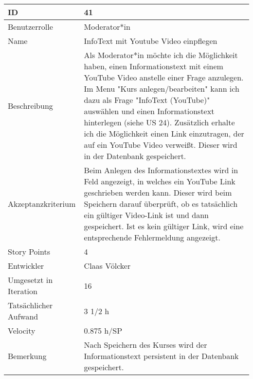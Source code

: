 \begin{tabularx}{\textwidth}{|p{}|X|}
	\hline
	ID & 41\\
	\hline
	Benutzerrolle & Moderator*in\\
	\hline
	Name & InfoText mit Youtube Video einpflegen\\
	\hline
	Beschreibung & Als Moderator*in möchte ich die Möglichkeit haben, einen Informationstext mit einem YouTube Video anstelle einer Frage anzulegen. Im Menu "Kurs anlegen/bearbeiten" kann ich dazu als Frage "InfoText (YouTube)" auswählen und einen Informationstext hinterlegen (siehe US 24). Zusätzlich erhalte ich die Möglichkeit einen Link einzutragen, der auf ein YouTube Video verweißt. Dieser wird in der Datenbank gespeichert.\\
	\hline
	Akzeptanzkriterium & Beim Anlegen des Informationstextes wird in Feld angezeigt, in welches ein YouTube Link geschrieben werden kann. Dieser wird beim Speichern darauf überprüft, ob es tatsächlich ein gültiger Video-Link ist und dann gespeichert. Ist es kein gültiger Link, wird eine entsprechende Fehlermeldung angezeigt. \\
	\hline
	Story Points & 4\\
	\hline
	Entwickler & Claas Völcker\\
	\hline
	Umgesetzt in Iteration & 16\\
	\hline
	Tatsächlicher Aufwand & 3 1/2 h\\
	\hline
	Velocity & 0.875 h/SP\\
	\hline
	Bemerkung & Nach Speichern des Kurses wird der Informationstext persistent in der Datenbank gespeichert.\\
	\hline
\end{tabularx}
\vspace{20pt}
